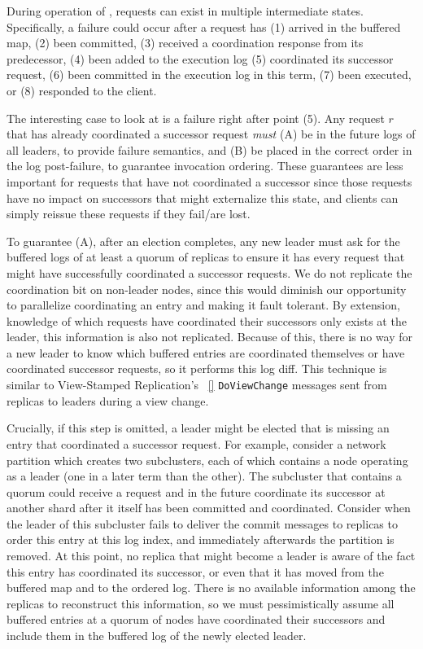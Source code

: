 During operation of \protocol, requests can exist in multiple intermediate states. Specifically, a failure could occur after a request has (1) arrived in the buffered map, (2) been committed, (3) received a coordination response from its predecessor, (4) been added to the execution log (5) coordinated its successor request, (6) been committed in the execution log in this term, (7) been executed, or (8) responded to the client. 

The interesting case to look at is a failure right after point (5). Any request $r$ that has already coordinated a successor request \textit{must} (A) be in the future logs of all leaders, to provide failure semantics, and (B) be placed in the correct order in the log post-failure, to guarantee invocation ordering. These guarantees are less important for requests that have not coordinated a successor since those requests have no impact on successors that might externalize this state, and clients can simply reissue these requests if they fail/are lost. 

To guarantee (A), after an election completes, any new leader must ask for the buffered logs of at least a quorum of replicas to ensure it has every request that might have successfully coordinated a successor requests. We do not replicate the coordination bit on non-leader nodes, since this would diminish our opportunity to parallelize coordinating an entry and making it fault tolerant. By extension, knowledge of which requests have coordinated their successors only exists at the leader, this information is also not replicated. Because of this, there is no way for a new leader to know which buffered entries are coordinated themselves or have coordinated successor requests, so it performs this log diff. This technique is similar to View-Stamped Replication's ~\ref{} \texttt{DoViewChange} messages sent from replicas to leaders during a view change. 

Crucially, if this step is omitted, a leader might be elected that is missing an entry that coordinated a successor request. For example, consider a network partition which creates two subclusters, each of which contains a node operating as a leader (one in a later term than the other). The subcluster that contains a quorum could receive a request and in the future coordinate its successor at another shard after it itself has been committed and coordinated. Consider when the leader of this subcluster fails to deliver the commit messages to replicas to order this entry at this log index, and immediately afterwards the partition is removed. At this point, no replica that might become a leader is aware of the fact this entry has coordinated its successor, or even that it has moved from the buffered map and to the ordered log. There is no available information among the replicas to reconstruct this information, so we must pessimistically assume all buffered entries at a quorum of nodes have coordinated their successors and include them in the buffered log of the newly elected leader.

